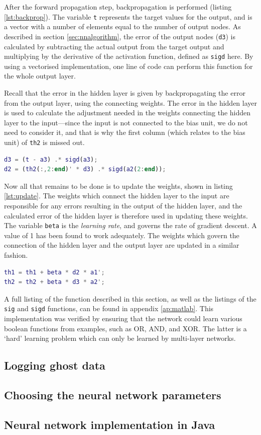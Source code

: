 After the forward propagation step, backpropagation is performed (listing \ref{lst:backprop}).  The variable {\tt t} represents the target values for the output, and is a vector with a number of elements equal to the number of output nodes.  As described in section \ref{sec:nnalgorithm}, the error of the output nodes ({\tt d3}) is calculated by subtracting the actual output from the target output and multiplying by the derivative of the activation function, defined as {\tt sigd} here.  By using a vectorised implementation, one line of code can perform this function for the whole output layer.

Recall that the error in the hidden layer is given by backpropagating the error from the output layer, using the connecting weights.  The error in the hidden layer is used to calculate the adjustment needed in the weights connecting the hidden layer to the input---since the input is not connected to the bias unit, we do not need to consider it, and that is why the first column (which relates to the bias unit) of {\tt th2} is missed out.

\begin{lstlisting}[language=Matlab,label=lst:backprop,caption={Backpropagation code},captionpos=b]
d3 = (t - a3) .* sigd(a3);
d2 = (th2(:,2:end)' * d3) .* sigd(a2(2:end));
\end{lstlisting}

Now all that remains to be done is to update the weights, shown in listing \ref{lst:update}.  The weights which connect the hidden layer to the input are responsible for any errors resulting in the output of the hidden layer, and the calculated error of the hidden layer is therefore used in updating these weights.  The variable {\tt beta} is the \emph{learning rate}, and governs the rate of gradient descent.  A value of 1 has been found to work adequately.  The weights which govern the connection of the hidden layer and the output layer are updated in a similar fashion.

\begin{lstlisting}[language=Matlab,label=lst:update,caption={Weight update code},captionpos=b]
th1 = th1 + beta * d2 * a1';
th2 = th2 + beta * d3 * a2';
\end{lstlisting}

A full listing of the function described in this section, as well as the listings of the {\tt sig} and {\tt sigd} functions, can be found in appendix \ref{ap:matlab}.  This implementation was verified by ensuring that the network could learn various boolean functions from examples, such as OR, AND, and XOR.  The latter is a `hard' learning problem which can only be learned by multi-layer networks.

\subsection{Logging ghost data}

\subsection{Choosing the neural network parameters}

\subsection{Neural network implementation in Java}

